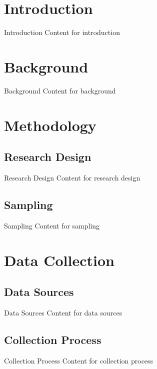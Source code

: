 \def\longtitle{Test Presentation with TOC}
\def\shorttitle{Test TOC}
\def\myname{Test Author}
\def\whichdate{\today}






\section{Introduction}
\begin{frame}{Introduction}
    Content for introduction
\end{frame}

\section{Background}
\begin{frame}{Background}
    Content for background
\end{frame}

\section{Methodology}
\subsection{Research Design}
\begin{frame}{Research Design}
    Content for research design
\end{frame}

\subsection{Sampling}
\begin{frame}{Sampling}
    Content for sampling
\end{frame}

\section{Data Collection}
\subsection{Data Sources}
\begin{frame}{Data Sources}
    Content for data sources
\end{frame}

\subsection{Collection Process}
\begin{frame}{Collection Process}
    Content for collection process
\end{frame}

